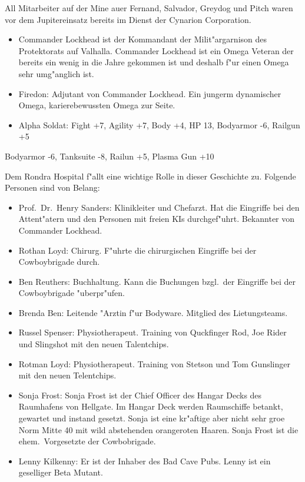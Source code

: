 All Mitarbeiter auf der Mine au\3er Fernand, Salvador, Greydog und Pitch waren vor dem Jupitereinsatz bereits im Dienst der Cynarion Corporation.


\begin{itemize}
    \item Commander Lockhead ist der Kommandant der Milit"argarnison des Protektorats auf Valhalla. Commander Lockhead ist ein Omega Veteran der bereits ein wenig in die Jahre gekommen ist und deshalb f"ur einen Omega sehr umg"anglich ist. 
    \item Firedon: Adjutant von Commander Lockhead. Ein jungerm dynamischer Omega, karierebewussten Omega zur Seite.
    \item Alpha Soldat: Fight +7, Agility +7, Body +4, HP 13, Bodyarmor -6, Railgun +5
\end{itemize}

Bodyarmor -6, Tanksuite -8, Railun +5, Plasma Gun +10


Dem Rondra Hospital f"allt eine wichtige Rolle in dieser Geschichte zu. Folgende Personen sind von Belang:

\begin{itemize}
    \item Prof.~Dr.~Henry Sanders: Klinikleiter und Chefarzt. Hat die Eingriffe bei den Attent"atern und den Personen mit freien KIs durchgef"uhrt. Bekannter von Commander Lockhead.
    \item Rothan Loyd: Chirurg. F"uhrte die chirurgischen Eingriffe bei der Cowboybrigade durch.
    \item Ben Reuthers: Buchhaltung. Kann die Buchungen bzgl.~der Eingriffe bei der Cowboybrigade "uberpr"ufen.
    \item Brenda Ben: Leitende "Arztin f"ur Bodyware. Mitglied des Lietungsteams.
    \item Russel Spenser: Physiotherapeut. Training von Quckfinger Rod, Joe Rider und Slingshot mit den neuen Talentchips.
    \item Rotman Loyd: Physiotherapeut. Training von Stetson und Tom Gunslinger mit den neuen Telentchips.    
\end{itemize}


\begin{itemize}
    \item Sonja Frost: Sonja Frost ist der Chief Officer des Hangar Decks des Raumhafens von Hellgate. Im Hangar Deck werden Raumschiffe betankt, gewartet und instand gesetzt. Sonja ist eine kr"aftige aber nicht sehr gro\3e Norm Mitte 40 mit wild abstehenden orangeroten Haaren. Sonja Frost ist die ehem.~Vorgesetzte der Cowbobrigade.
    \item Lenny Kilkenny: Er ist der Inhaber des Bad Cave Pubs. Lenny ist ein geselliger Beta Mutant.
\end{itemize}

